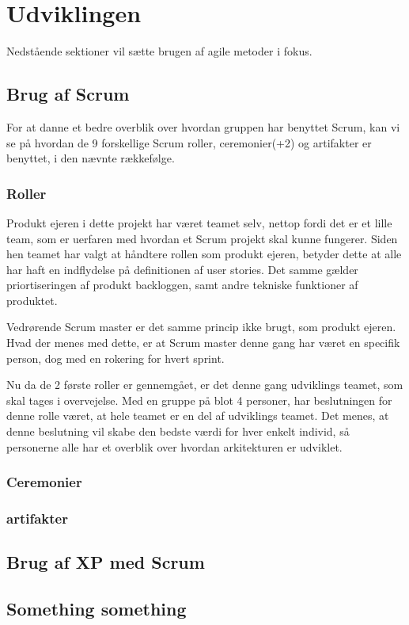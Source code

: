 \chapter{Udviklingen}\label{ch:Udviklingen}

Nedstående sektioner vil sætte brugen af agile metoder i fokus. 

\section{Brug af Scrum}

For at danne et bedre overblik over hvordan gruppen har benyttet Scrum, kan vi se på hvordan de 9 forskellige Scrum roller, ceremonier(+2) og artifakter er benyttet, i den nævnte rækkefølge.

\subsection{Roller}

Produkt ejeren i dette projekt har været teamet selv, nettop fordi det er et lille team, som er uerfaren med hvordan et Scrum projekt skal kunne fungerer. Siden hen teamet har valgt at håndtere rollen som produkt ejeren, betyder dette at alle har haft en indflydelse på definitionen af user stories. Det samme gælder priortiseringen af produkt backloggen, samt andre tekniske funktioner af produktet. 

Vedrørende Scrum master er det samme princip ikke brugt, som produkt ejeren. Hvad der menes med dette, er at Scrum master denne gang har været en specifik person, dog med en rokering for hvert sprint. 

Nu da de 2 første roller er gennemgået, er det denne gang udviklings teamet, som skal tages i overvejelse. Med en gruppe på blot 4 personer, har beslutningen for denne rolle været, at hele teamet er en del af udviklings teamet. Det menes, at denne beslutning vil skabe den bedste værdi for hver enkelt individ, så personerne alle har et overblik over hvordan arkitekturen er udviklet. 



\subsection{Ceremonier}



\subsection{artifakter}





\section{Brug af XP med Scrum}



\section{Something something}